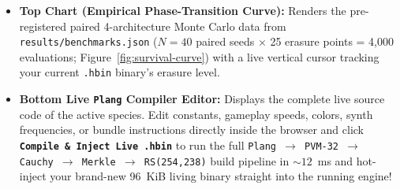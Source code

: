 \documentclass[10pt,letterpaper]{article}
\begin{document}
\begin{itemize}[leftmargin=1.5em, itemsep=1.5pt]
  \item \textbf{Top Chart (Empirical Phase-Transition Curve):} Renders the pre-registered paired 4-architecture Monte Carlo data from \texttt{results/benchmarks.json} ($N = 40$ paired seeds $\times$ 25 erasure points = 4,000 evaluations; Figure~\ref{fig:survival-curve}) with a live vertical cursor tracking your current \texttt{.hbin} binary's erasure level.
  \item \textbf{Bottom Live \texttt{Plang} Compiler Editor:} Displays the complete live source code of the active species. Edit constants, gameplay speeds, colors, synth frequencies, or bundle instructions directly inside the browser and click \textbf{\texttt{Compile \& Inject Live .hbin}} to run the full \texttt{Plang $\to$ PVM-32 $\to$ Cauchy $\to$ Merkle $\to$ RS(254,238)} build pipeline in $\sim 12$~ms and hot-inject your brand-new 96~KiB living binary straight into the running engine!
\end{itemize}
\end{document}
